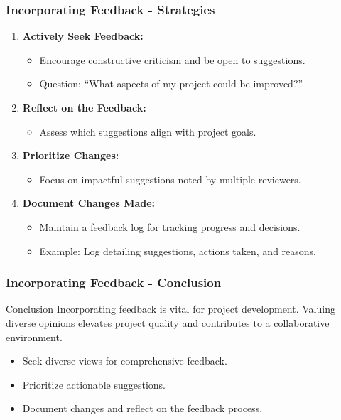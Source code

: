 \documentclass[aspectratio=169]{beamer}
\begin{document}
\begin{frame}[fragile]
  \frametitle{Incorporating Feedback - Strategies}
  \begin{enumerate}
    \item \textbf{Actively Seek Feedback:}
      \begin{itemize}
        \item Encourage constructive criticism and be open to suggestions.
        \item Question: “What aspects of my project could be improved?”
      \end{itemize}
    \item \textbf{Reflect on the Feedback:}
      \begin{itemize}
        \item Assess which suggestions align with project goals.
      \end{itemize}
    \item \textbf{Prioritize Changes:}
      \begin{itemize}
        \item Focus on impactful suggestions noted by multiple reviewers.
      \end{itemize}
    \item \textbf{Document Changes Made:}
      \begin{itemize}
        \item Maintain a feedback log for tracking progress and decisions.
        \item Example: Log detailing suggestions, actions taken, and reasons.
      \end{itemize}
  \end{enumerate}
\end{frame}

\begin{frame}[fragile]
  \frametitle{Incorporating Feedback - Conclusion}
  \begin{block}{Conclusion}
    Incorporating feedback is vital for project development. Valuing diverse opinions elevates project quality and contributes to a collaborative environment.
  \end{block}
  \begin{itemize}
    \item Seek diverse views for comprehensive feedback.
    \item Prioritize actionable suggestions.
    \item Document changes and reflect on the feedback process.
  \end{itemize}
\end{frame}
\end{document}
